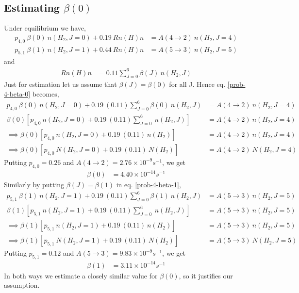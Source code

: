 \documentclass{jhwhw}
\begin{document}
\subsection{Estimating $\beta(0)$}
Under equilibrium we have,
\begin{align}
\label{prob-4-beta-0}
p_{4,0} ~\beta(0) ~n(H_2,J=0) + 0.19 ~R n(H)n &= A(4\to 2) ~n(H_2,J=4)\\
\label{prob-4-beta-1}
p_{5,1} ~\beta(1) ~n(H_2,J=1) + 0.44 ~R n(H)n &= A(5\to 3) ~n(H_2,J=5)
\end{align}
and
\begin{align}
R n(H)n &= 0.11 \sum_{J=0}^{6} \beta(J) ~n(H_2,J)
\end{align}
Just for estimation let us assume that $\beta(J)=\beta(0)$ for all J. Hence eq. \eqref{prob-4-beta-0} becomes,
\begin{align}
\label{prob-4-beta-0-1}
p_{4,0} ~\beta(0) ~n(H_2,J=0) + 0.19 ~(0.11) \sum_{J=0}^{6} \beta(0) ~n(H_2,J) &= A(4\to 2) ~n(H_2,J=4)\\
\beta(0) \left[ p_{4,0} ~n(H_2,J=0) + 0.19 ~(0.11) \sum_{J=0}^{6} ~n(H_2,J) \right] &= A(4\to 2) ~n(H_2,J=4)\\
\implies \beta(0) \left[ p_{4,0} ~n(H_2,J=0) + 0.19 ~(0.11) ~n(H_2) \right] &= A(4\to 2) ~n(H_2,J=4)\\
\implies \beta(0) \left[ p_{4,0} ~N(H_2,J=0) + 0.19 ~(0.11) ~N(H_2) \right] &= A(4\to 2) ~N(H_2,J=4)
\end{align}
Putting $p_{4,0} = 0.26$ and $A(4\to 2) = 2.76 \times 10^{-9} s^{-1}$, we get 
\begin{align}
\beta(0) &= 4.40 \times 10^{-14} s^{-1}
\end{align}
%
%
Similarly by putting $\beta(J)=\beta(1)$ in eq. \eqref{prob-4-beta-1},
\begin{align}
\label{prob-4-beta-1-1}
p_{5,1} ~\beta(1) ~n(H_2,J=1) + 0.19 ~(0.11) \sum_{J=0}^{6} \beta(1) ~n(H_2,J) &= A(5\to 3) ~n(H_2,J=5)\\
\beta(1) \left[ p_{5,1} ~n(H_2,J=1) + 0.19 ~(0.11) \sum_{J=0}^{6} ~n(H_2,J) \right] &= A(5\to 3) ~n(H_2,J=5)\\
\implies \beta(1) \left[ p_{5,1} ~n(H_2,J=1) + 0.19 ~(0.11) ~n(H_2) \right] &= A(5\to 3) ~n(H_2,J=5)\\
\implies \beta(1) \left[ p_{5,1} ~N(H_2,J=1) + 0.19 ~(0.11) ~N(H_2) \right] &= A(5\to 3) ~N(H_2,J=5)
\end{align}
Putting $p_{5,1} = 0.12$ and $A(5\to 3) = 9.83 \times 10^{-9} s^{-1}$, we get 
\begin{align}
\beta(1) &= 3.11 \times 10^{-14} s^{-1}
\end{align}
In both ways we estimate a closely similar value for $\beta(0)$, so it justifies our assumption.
\end{document}
